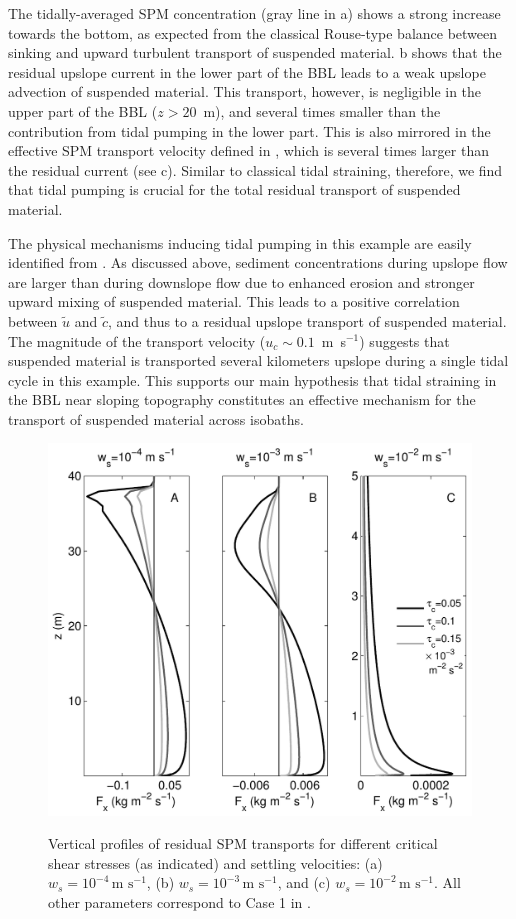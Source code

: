 The tidally-averaged SPM concentration (gray line in a)
shows a strong increase towards the bottom, as expected from the
classical Rouse-type balance between sinking and upward turbulent
transport of suspended material. b shows that the
residual upslope current in the lower part of the BBL leads to a weak
upslope advection of suspended material. This transport, however, is
negligible in the upper part of the BBL ($z>20$~m), and several times
smaller than the contribution from tidal pumping in the lower
part. This is also mirrored in the effective SPM transport velocity
defined in , which is several times larger than the residual
current (see c). Similar to classical tidal straining,
therefore, we find that tidal pumping is crucial for the total
residual transport of suspended material.

The physical mechanisms inducing tidal pumping in this example are
easily identified from . As discussed above,
sediment concentrations during upslope flow are larger than during
downslope flow due to enhanced erosion and stronger upward mixing of
suspended material. This leads to a positive correlation between
$\tilde{u}$ and $\tilde{c}$, and thus to a residual upslope transport
of suspended material. The magnitude of the transport velocity ($u_c
\sim 0.1$~m~s$^{-1}$) suggests that suspended material is transported
several kilometers upslope during a single tidal cycle in this
example. This supports our main hypothesis that tidal straining in the
BBL near sloping topography constitutes an effective mechanism for the
transport of suspended material across isobaths.
\begin{figure}[h]
  \noindent\includegraphics[width=30pc,angle=0]{bilder/tauws.pdf}\\
  \caption{Vertical profiles of residual SPM transports for different
    critical shear stresses (as indicated) and settling velocities:
    (a) $w_s = 10^{-4}\, \text{m s}^{-1}$, (b) $w_s = 10^{-3}\,
    \text{m s}^{-1}$, and (c) $w_s = 10^{-2}\, \text{m s}^{-1}$. All
    other parameters correspond to Case 1 in
    .}\label{compareflux}
\end{figure}


